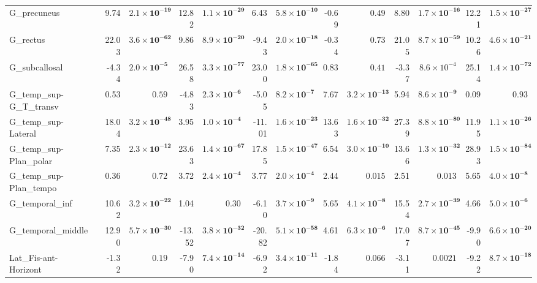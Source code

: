 {\begin{longtable}{llrrrrrrrrrrrr}
G\_precuneus &  & 9.74 & $\mathbf{2.1{\times}10^{-19}}$ & 12.82 & $\mathbf{1.1{\times}10^{-29}}$ & 6.43 & $\mathbf{5.8{\times}10^{-10}}$ & -0.69 & $0.49$ & 8.80 & $\mathbf{1.7{\times}10^{-16}}$ & 12.21 & $\mathbf{1.5{\times}10^{-27}}$ \\
G\_rectus &  & 22.03 & $\mathbf{3.6{\times}10^{-62}}$ & 9.86 & $\mathbf{8.9{\times}10^{-20}}$ & -9.43 & $\mathbf{2.0{\times}10^{-18}}$ & -0.34 & $0.73$ & 21.05 & $\mathbf{8.7{\times}10^{-59}}$ & 10.26 & $\mathbf{4.6{\times}10^{-21}}$ \\
G\_subcallosal &  & -4.34 & $\mathbf{2.0{\times}10^{-5}}$ & 26.58 & $\mathbf{3.3{\times}10^{-77}}$ & 23.00 & $\mathbf{1.8{\times}10^{-65}}$ & 0.83 & $0.41$ & -3.37 & $8.6{\times}10^{-4}$ & 25.14 & $\mathbf{1.4{\times}10^{-72}}$ \\
G\_temp\_sup-G\_T\_transv &  & 0.53 & $0.59$ & -4.83 & $\mathbf{2.3{\times}10^{-6}}$ & -5.05 & $\mathbf{8.2{\times}10^{-7}}$ & 7.67 & $\mathbf{3.2{\times}10^{-13}}$ & 5.94 & $\mathbf{8.6{\times}10^{-9}}$ & 0.09 & $0.93$ \\
G\_temp\_sup-Lateral &  & 18.04 & $\mathbf{3.2{\times}10^{-48}}$ & 3.95 & $\mathbf{1.0{\times}10^{-4}}$ & -11.01 & $\mathbf{1.6{\times}10^{-23}}$ & 13.63 & $\mathbf{1.6{\times}10^{-32}}$ & 27.39 & $\mathbf{8.8{\times}10^{-80}}$ & 11.95 & $\mathbf{1.1{\times}10^{-26}}$ \\
G\_temp\_sup-Plan\_polar &  & 7.35 & $\mathbf{2.3{\times}10^{-12}}$ & 23.63 & $\mathbf{1.4{\times}10^{-67}}$ & 17.85 & $\mathbf{1.5{\times}10^{-47}}$ & 6.54 & $\mathbf{3.0{\times}10^{-10}}$ & 13.66 & $\mathbf{1.3{\times}10^{-32}}$ & 28.93 & $\mathbf{1.5{\times}10^{-84}}$ \\
G\_temp\_sup-Plan\_tempo &  & 0.36 & $0.72$ & 3.72 & $\mathbf{2.4{\times}10^{-4}}$ & 3.77 & $\mathbf{2.0{\times}10^{-4}}$ & 2.44 & $0.015$ & 2.51 & $0.013$ & 5.65 & $\mathbf{4.0{\times}10^{-8}}$ \\
G\_temporal\_inf &  & 10.62 & $\mathbf{3.2{\times}10^{-22}}$ & 1.04 & $0.30$ & -6.10 & $\mathbf{3.7{\times}10^{-9}}$ & 5.65 & $\mathbf{4.1{\times}10^{-8}}$ & 15.54 & $\mathbf{2.7{\times}10^{-39}}$ & 4.66 & $\mathbf{5.0{\times}10^{-6}}$ \\
G\_temporal\_middle &  & 12.90 & $\mathbf{5.7{\times}10^{-30}}$ & -13.52 & $\mathbf{3.8{\times}10^{-32}}$ & -20.82 & $\mathbf{5.1{\times}10^{-58}}$ & 4.61 & $\mathbf{6.3{\times}10^{-6}}$ & 17.07 & $\mathbf{8.7{\times}10^{-45}}$ & -9.90 & $\mathbf{6.6{\times}10^{-20}}$ \\
Lat\_Fis-ant-Horizont &  & -1.32 & $0.19$ & -7.90 & $\mathbf{7.4{\times}10^{-14}}$ & -6.92 & $\mathbf{3.4{\times}10^{-11}}$ & -1.84 & $0.066$ & -3.11 & $0.0021$ & -9.22 & $\mathbf{8.7{\times}10^{-18}}$ \\

\end{longtable}}
